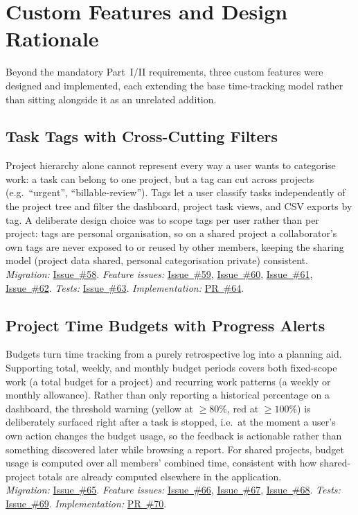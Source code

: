 \documentclass[11pt,a4paper]{article}
\newcommand{\repourl}{https://github.com/se2p-classrooms/final-project-ayoubalila}
\newcommand{\ghissue}[1]{\href{\repourl/issues/#1}{Issue~\##1}}
\newcommand{\ghpr}[1]{\href{\repourl/pull/#1}{PR~\##1}}
\begin{document}
\section{Custom Features and Design Rationale}

Beyond the mandatory Part~I/II requirements, three custom features were designed and implemented, each extending the base time-tracking model rather than sitting alongside it as an unrelated addition.

\subsection{Task Tags with Cross-Cutting Filters}
Project hierarchy alone cannot represent every way a user wants to categorise work: a task can belong to one project, but a tag can cut across projects (e.g.\ ``urgent'', ``billable-review''). Tags let a user classify tasks independently of the project tree and filter the dashboard, project task views, and CSV exports by tag. A deliberate design choice was to scope tags per user rather than per project: tags are personal organisation, so on a shared project a collaborator's own tags are never exposed to or reused by other members, keeping the sharing model (project data shared, personal categorisation private) consistent.
\\[2pt]
\textit{Migration:} \ghissue{58}. \textit{Feature issues:} \ghissue{59}, \ghissue{60}, \ghissue{61}, \ghissue{62}. \textit{Tests:} \ghissue{63}. \textit{Implementation:} \ghpr{64}.

\subsection{Project Time Budgets with Progress Alerts}
Budgets turn time tracking from a purely retrospective log into a planning aid. Supporting total, weekly, and monthly budget periods covers both fixed-scope work (a total budget for a project) and recurring work patterns (a weekly or monthly allowance). Rather than only reporting a historical percentage on a dashboard, the threshold warning (yellow at $\geq 80\%$, red at $\geq 100\%$) is deliberately surfaced right after a task is stopped, i.e.\ at the moment a user's own action changes the budget usage, so the feedback is actionable rather than something discovered later while browsing a report. For shared projects, budget usage is computed over all members' combined time, consistent with how shared-project totals are already computed elsewhere in the application.
\\[2pt]
\textit{Migration:} \ghissue{65}. \textit{Feature issues:} \ghissue{66}, \ghissue{67}, \ghissue{68}. \textit{Tests:} \ghissue{69}. \textit{Implementation:} \ghpr{70}.
\end{document}
